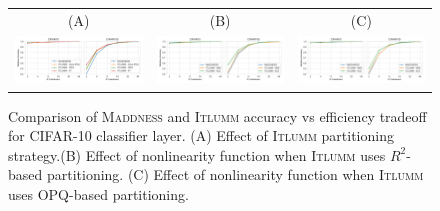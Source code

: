 \documentclass{article}
\begin{document}
\begin{figure}[h!]
    \centering
    \begin{tabular}{ccc}
    (A) & (B) & (C) \\
    \includegraphics[scale=0.45,clip=true,trim=0 0in 4.1in  0.3in]{figures/cifar-partitioning-heuristic.pdf} & \includegraphics[scale=0.45,clip=true,trim=0 0in 4.1in  0.3in]{figures/cifar-objective-wR2.pdf} &
    \includegraphics[scale=0.45,clip=true,trim=0 0in 4.1in  0.3in]{figures/cifar-objective-wOPQ.pdf}
    \end{tabular}
    \caption{Comparison of \textsc{Maddness} and \textsc{Itlumm} accuracy vs efficiency tradeoff for CIFAR-10 classifier layer. (A) Effect of \textsc{Itlumm} partitioning strategy.(B) Effect of nonlinearity function when \textsc{Itlumm} uses $R^2$-based partitioning.
    (C) Effect of nonlinearity function when \textsc{Itlumm} uses OPQ-based partitioning.}
    \label{fig:cifar100}
\end{figure}
\fi
\end{document}
